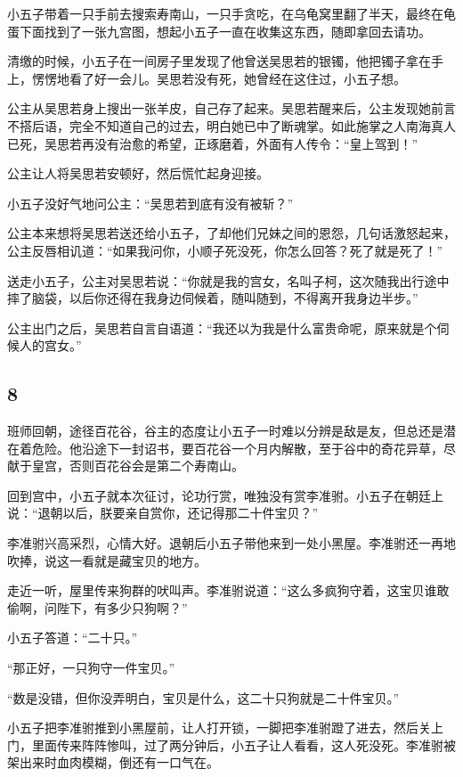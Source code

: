 小五子带着一只手前去搜索寿南山，一只手贪吃，在乌龟窝里翻了半天，最终在龟蛋下面找到了一张九宫图，想起小五子一直在收集这东西，随即拿回去请功。

清缴的时候，小五子在一间房子里发现了他曾送吴思若的银镯，他把镯子拿在手上，愣愣地看了好一会儿。吴思若没有死，她曾经在这住过，小五子想。
\newline

公主从吴思若身上搜出一张羊皮，自己存了起来。吴思若醒来后，公主发现她前言不搭后语，完全不知道自己的过去，明白她已中了断魂掌。如此施掌之人南海真人已死，吴思若再没有治愈的希望，正琢磨着，外面有人传令：“皇上驾到！”

公主让人将吴思若安顿好，然后慌忙起身迎接。

小五子没好气地问公主：“吴思若到底有没有被斩？”

公主本来想将吴思若送还给小五子，了却他们兄妹之间的恩怨，几句话激怒起来，公主反唇相讥道：“如果我问你，小顺子死没死，你怎么回答？死了就是死了！”

送走小五子，公主对吴思若说：“你就是我的宫女，名叫子柯，这次随我出行途中摔了脑袋，以后你还得在我身边伺候着，随叫随到，不得离开我身边半步。”

公主出门之后，吴思若自言自语道：“我还以为我是什么富贵命呢，原来就是个伺候人的宫女。”
\newline

{\centering\subsection{8}}

班师回朝，途径百花谷，谷主的态度让小五子一时难以分辨是敌是友，但总还是潜在着危险。他沿途下一封诏书，要百花谷一个月内解散，至于谷中的奇花异草，尽献于皇宫，否则百花谷会是第二个寿南山。
\newline

回到宫中，小五子就本次征讨，论功行赏，唯独没有赏李准驸。小五子在朝廷上说：“退朝以后，朕要亲自赏你，还记得那二十件宝贝？”

李准驸兴高采烈，心情大好。退朝后小五子带他来到一处小黑屋。李准驸还一再地吹捧，说这一看就是藏宝贝的地方。

走近一听，屋里传来狗群的吠叫声。李准驸说道：“这么多疯狗守着，这宝贝谁敢偷啊，问陛下，有多少只狗啊？”

小五子答道：“二十只。”

“那正好，一只狗守一件宝贝。”

“数是没错，但你没弄明白，宝贝是什么，这二十只狗就是二十件宝贝。”

小五子把李准驸推到小黑屋前，让人打开锁，一脚把李准驸蹬了进去，然后关上门，里面传来阵阵惨叫，过了两分钟后，小五子让人看看，这人死没死。李准驸被架出来时血肉模糊，倒还有一口气在。


